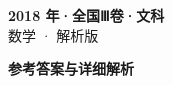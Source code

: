 \documentclass[zihao=-4, a4paper]{ctexart}
\begin{document}
\begin{center}
  {\Large\bfseries 2018 年·全国Ⅲ卷·文科}\\[4pt]
  {\large 数学 · 解析版}
\end{center}
\medskip
{}

\clearpage
{}
\begin{center}{\Large\bfseries 参考答案与详细解析}\end{center}
\medskip

\end{document}
